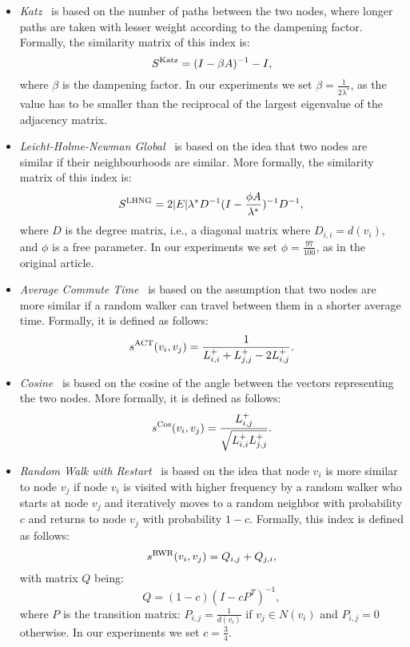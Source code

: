 \documentclass[twocolumn]{article}
\newcommand{\sACT}{s^{\text{\normalfont ACT}}}
\newcommand{\sCos}{s^{\text{\normalfont Cos}}}
\newcommand{\sRWR}{s^{\text{\normalfont RWR}}}
\newcommand{\SKatz}{S^{\text{\normalfont Katz}}}
\newcommand{\SLHNG}{S^{\text{\normalfont LHNG}}}
\begin{document}
\begin{itemize}

\item \emph{Katz}~\cite{katz1953new} is based on the number of paths between the two nodes, where longer paths are taken with lesser weight according to the dampening factor. Formally, the similarity matrix of this index is:
$$
\SKatz = (I - \beta A)^{-1} - I,
$$
\noindent where $\beta$ is the dampening factor.
In our experiments we set $\beta=\frac{1}{2 \lambda^*}$, as the value has to be smaller than the reciprocal of the largest eigenvalue of the adjacency matrix.

\item \emph{Leicht-Holme-Newman Global}~\cite{leicht2006vertex} is based on the idea that two nodes are similar if their neighbourhoods are similar. More formally, the similarity matrix of this index is:
$$
\SLHNG = 2 |E| \lambda^* D^{-1} (I - \frac{\phi A}{\lambda^*})^{-1} D^{-1},
$$
\noindent where $D$ is the degree matrix, i.e., a diagonal matrix where $D_{i,i}=d(v_i)$, and $\phi$ is a free parameter.
In our experiments we set $\phi = \frac{97}{100}$, as in the original article.

\item \emph{Average Commute Time}~\cite{gobel1974random} is based on the assumption that two nodes are more similar if a random walker can travel between them in a shorter average time. Formally, it is defined as follows:
$$
\sACT(v_i,v_j) = \frac{1}{L^+_{i,i}+L^+_{j,j}-2L^+_{i,j}}.
$$

\item \emph{Cosine}~\cite{fouss2007random} is based on the cosine of the angle between the vectors representing the two nodes. More formally, it is defined as follows:
$$
\sCos(v_i,v_j) = \frac{L^+_{i,j}}{\sqrt{L^+_{i,i} L^+_{j,j}}}.
$$

\item \emph{Random Walk with Restart}~\cite{brin1998anatomy} is based on the idea that node $v_i$ is more similar to node $v_j$ if node $v_i$ is visited with higher frequency by a random walker who starts at node $v_j$ and iteratively moves to a random neighbor with probability $c$ and returns to node $v_j$ with probability $1-c$. Formally, this index is defined as follows:
$$
\sRWR(v_i,v_j) = Q_{i,j}+Q_{j,i},
$$
\noindent with matrix $Q$ being:
$$
Q=(1-c)(I-cP^T)^{-1},
$$
\noindent where $P$ is the transition matrix: $P_{i,j}=\frac{1}{d(v_i)}$ if $v_j \in N(v_i)$ and $P_{i,j}=0$ otherwise.
In our experiments we set $c=\frac{3}{4}$.


\end{itemize}
\end{document}
